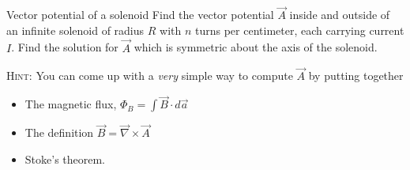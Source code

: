 \documentclass[makesolutionspdf]{esg8022pset}
\begin{document}
\begin{problem}{Vector potential of a solenoid}
  Find the vector potential $\vec A$ inside and outside of an infinite solenoid
  of radius $R$ with $n$ turns per centimeter, each carrying current $I$.  Find
  the solution for $\vec A$ which is symmetric about the axis of the solenoid.

  \noindent \textsc{Hint}: You can come up with a \emph{very} simple way to
  compute $\vec A$ by putting together
  \begin{itemize}
    \item The magnetic flux, $\Phi_B = \int \vec B\cdot d\vec a$
    \item The definition $\vec B = \vec\nabla\times\vec A$
    \item Stoke's theorem.
  \end{itemize}
\end{problem}
\end{document}
